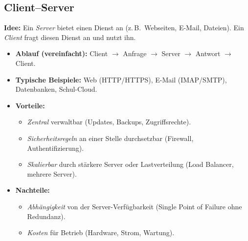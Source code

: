 \documentclass[../skript/main.tex]{subfiles}
\begin{document}
\subsection{Client–Server}
\textbf{Idee:} Ein \emph{Server} bietet einen Dienst an (z.\,B.\ Webseiten, E-Mail, Dateien). Ein \emph{Client} fragt diesen Dienst an und nutzt ihn.
\begin{itemize}
	\item \textbf{Ablauf (vereinfacht):} Client \(\rightarrow\) Anfrage \(\rightarrow\) Server \(\rightarrow\) Antwort \(\rightarrow\) Client.
	\item \textbf{Typische Beispiele:} Web (HTTP/HTTPS), E-Mail (IMAP/SMTP), Datenbanken, Schul-Cloud.
	\item \textbf{Vorteile:}
	\begin{itemize}
		\item \emph{Zentral} verwaltbar (Updates, Backups, Zugriffsrechte).
		\item \emph{Sicherheitsregeln} an einer Stelle durchsetzbar (Firewall, Authentifizierung).
		\item \emph{Skalierbar} durch stärkere Server oder Lastverteilung (Load Balancer, mehrere Server).
	\end{itemize}
	\item \textbf{Nachteile:}
	\begin{itemize}
		\item \emph{Abhängigkeit} von der Server-Verfügbarkeit (Single Point of Failure ohne Redundanz).
		\item \emph{Kosten} für Betrieb (Hardware, Strom, Wartung).
	\end{itemize}
\end{itemize}
\end{document}
